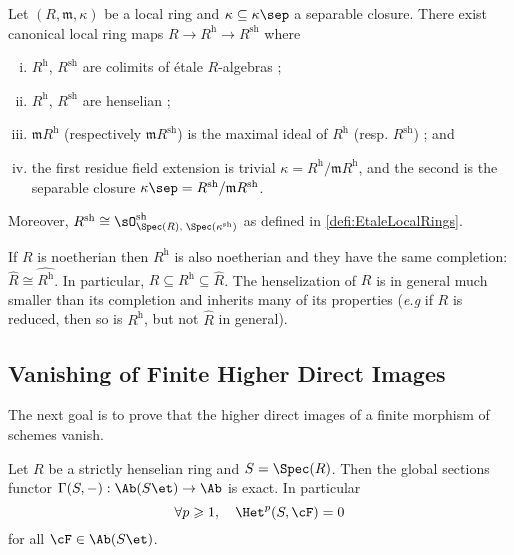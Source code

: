 \begin{thm}
Let $(R, \mathfrak m, \kappa)$ be a local ring and $\kappa\subseteq\kappa\sep$ a separable closure. There exist canonical local ring maps $ R\to R^\text{h} \to R^\text{sh}$ where
\begin{enumerate}[i.]
\item $R^\text{h}$, $R^\text{sh}$ are colimits of \'etale $R$-algebras ;
\item $R^\text{h}$, $R^\text{sh}$ are henselian ;
\item $\mathfrak m R^\text{h}$ (respectively $\mathfrak m R^\text{sh}$) is the maximal ideal of $R^\text{h}$ (resp. $R^\text{sh}$) ; and 
\item the first residue field extension is trivial $\kappa=R^\text{h}/\mathfrak m R^\text{h}$, and the second is the separable closure $\kappa\sep = R^\text{sh}/\mathfrak m R^\text{sh}$. 
\end{enumerate} 
Moreover, $R^\text{sh}\cong \sO^\text{sh}_{\Spec(R), \; \Spec(\kappa^\text{sh})}$ as defined in \ref{defi:EtaleLocalRings}.
\end{thm}

\begin{remark} 
If $R$ is noetherian then $R^\text{h}$ is also noetherian and they have the same completion: $\hat R\cong \widehat{R^\text{h}}$. In particular, $R\subseteq R^\text{h} \subseteq \hat R$. The henselization of $R$ is in general much smaller than its completion and inherits many of its properties ({\it e.g} if $R$ is reduced, then so is $R^\text{h}$, but not $\hat R$ in general).
\end{remark}

\subsection{Vanishing of Finite Higher Direct Images} 

The next goal is to prove that the higher direct images of a finite morphism of schemes vanish.

\begin{lem} \label{lem:vanishingOfCohomologyOverHenselianRings}
Let $R$ be a strictly henselian ring and $S=\Spec(R)$. Then the global sections functor $\Gamma(S, -): \Ab(S\et)\to \Ab$ is exact. In particular
$$
\forall p\geqslant 1, \quad \Het^p(S, \cF)=0
$$
for all $\cF\in \Ab(S\et)$. 
\end{lem}

